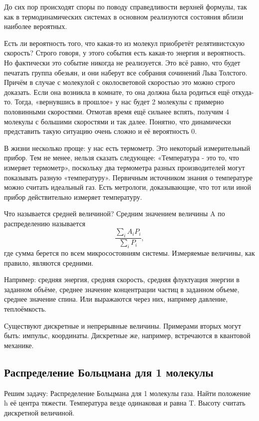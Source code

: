 \documentclass[a4paper, 12pt]{article}
\begin{document}
	До сих пор происходят споры по поводу справедливости верхней формулы, так как в термодинамических системах в основном реализуются состояния вблизи наиболее вероятных. 
	
	Есть ли вероятность того, что какая-то из молекул приобретёт релятивистскую скорость?
	Строго говоря, у этого события есть какая-то энергия и вероятность. Но фактически это событие никогда не реализуется. Это всё равно, что будет печатать группа обезьян, и они наберут все собрания сочинений Льва Толстого. Причём в случае с молекулой с околосветовой скоростью это можно строго доказать. Если она возникла в комнате, то она должна была родиться ещё откуда-то. Тогда, «вернувшись в прошлое» у нас будет 2 молекулы с примерно половинными скоростями. Отмотав время ещё сильнее вспять, получим 4 молекулы с большими скоростями и так далее. Понятно, что динамически представить такую ситуацию очень сложно и её вероятность 0. 
	
	В жизни несколько проще: у нас есть термометр. Это некоторый измерительный прибор. Тем не менее, нельзя сказать следующее: «Температура - это то, что измеряет термометр», поскольку два термометра разных производителей могут показывать разную «температуру». Первичным источником знания о температуре можно считать идеальный газ. Есть метрологи, доказывающие, что тот или иной прибор действительно измеряет температуру.
	
	Что называется средней величиной?
	Средним значением величины A по распределению называется 
	\begin{equation*}
		\frac{\sum_{i} A_i P_i }{\sum_{i} P_i},
	\end{equation*}
	где сумма берется по всем микросостояниям системы.
	Измеряемые величины, как правило, являются средними. 
	
	Например: средняя энергия, средняя скорость, средняя флуктуация энергии в заданном объёме, среднее значение концентрации частиц в заданном объеме, среднее значение спина. 
	Или выражаются через них, например давление, теплоёмкость.
	
	Существуют дискретные и непрерывные величины. Примерами вторых могут быть: импульс, координаты. Дискретные же, например, встречаются в квантовой механике.
	\subsection{Распределение Больцмана для 1 молекулы}
	Решим задачу: Распределение Больцмана для 1 молекулы газа. Найти положение h её центра тяжести. Температура везде одинаковая и равна T. Высоту считать дискретной величиной.
	
\end{document}
